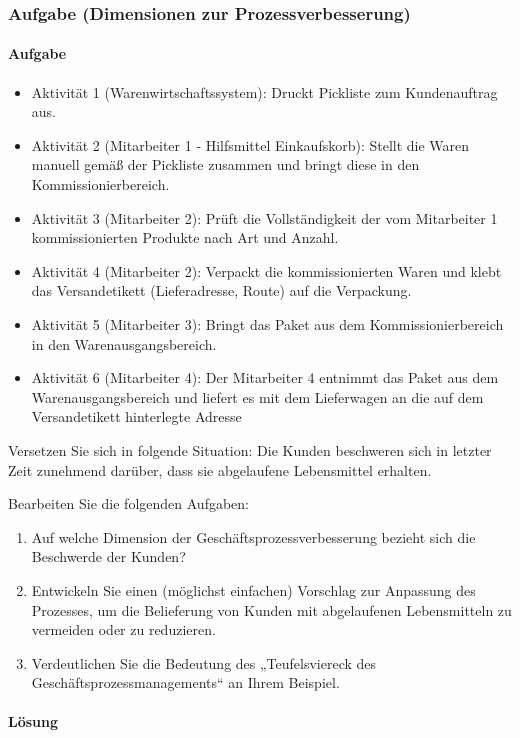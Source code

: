 \subsubsection*{Aufgabe (Dimensionen zur Prozessverbesserung)}
\paragraph*{Aufgabe}
    \begin{itemize}
        \item Aktivität 1 (Warenwirtschaftssystem): Druckt Pickliste zum Kundenauftrag aus.
        \item Aktivität 2 (Mitarbeiter 1 - Hilfsmittel Einkaufskorb): Stellt die Waren manuell gemäß der Pickliste zusammen und bringt diese in den Kommissionierbereich.
        \item Aktivität 3 (Mitarbeiter 2): Prüft die Vollständigkeit der vom Mitarbeiter 1 kommissionierten Produkte nach Art und Anzahl.
        \item Aktivität 4 (Mitarbeiter 2): Verpackt die kommissionierten Waren und klebt das Versandetikett (Lieferadresse, Route) auf die Verpackung.
        \item Aktivität 5 (Mitarbeiter 3): Bringt das Paket aus dem Kommissionierbereich in den Warenausgangsbereich.
        \item Aktivität 6 (Mitarbeiter 4): Der Mitarbeiter 4 entnimmt das Paket aus dem Warenausgangsbereich und liefert es mit dem Lieferwagen an die auf dem Versandetikett hinterlegte Adresse
    \end{itemize}

    Versetzen Sie sich in folgende Situation: Die Kunden beschweren sich in letzter Zeit zunehmend darüber, dass sie abgelaufene Lebensmittel erhalten.

    Bearbeiten Sie die folgenden Aufgaben:
    \begin{enumerate}[label=\alph*)]
        \item Auf welche Dimension der Geschäftsprozessverbesserung bezieht sich die Beschwerde der Kunden?
        \item Entwickeln Sie einen (möglichst einfachen) Vorschlag zur Anpassung des Prozesses, um die Belieferung von Kunden mit abgelaufenen Lebensmitteln zu vermeiden oder zu reduzieren.
        \item Verdeutlichen Sie die Bedeutung des „Teufelsviereck des Geschäftsprozessmanagements“ an Ihrem Beispiel.
    \end{enumerate}
\paragraph*{Lösung}


